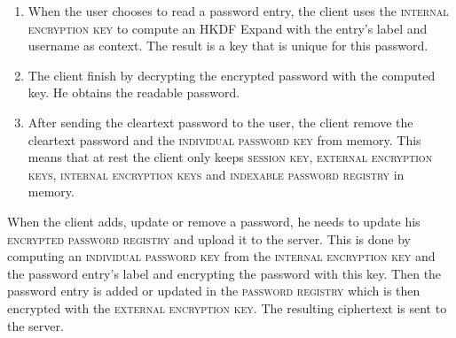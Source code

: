 \documentclass[../report.tex]{subfiles}
\begin{document}
\begin{enumerate}
 \item When the user chooses to read a password entry, the client uses the \textsc{internal encryption key} to compute an HKDF Expand with the entry's label and username as context. The result is a key that is unique for this password.
 \item The client finish by decrypting the encrypted password with the computed key. He obtains the readable password.
 \item After sending the cleartext password to the user, the client remove the cleartext password and the \textsc{individual password key} from memory. This means that at rest the client only keeps \textsc{session key}, \textsc{external encryption keys}, \textsc{internal encryption keys} and \textsc{indexable password registry} in memory.
\end{enumerate}

When the client adds, update or remove a password, he needs to update his \textsc{encrypted password registry} and upload it to the server. This is done by computing an \textsc{individual password key} from the \textsc{internal encryption key} and the password entry's label and encrypting the password with this key. Then the password entry is added or updated in the \textsc{password registry} which is then encrypted with the \textsc{external encryption key}. The resulting ciphertext is sent to the server.
\end{document}
